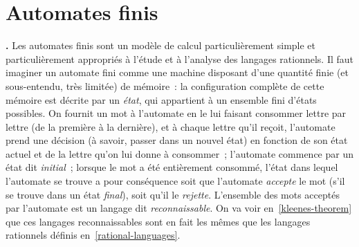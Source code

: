 \documentclass[12pt,a4paper]{article}
\theoremstyle{definition}
\newcommand\thingy{%
\refstepcounter{comcnt}\medskip\noindent\textbf{\thecomcnt.} }
\begin{document}
\section{Automates finis}\label{section-finite-automata}

\setcounter{comcnt}{0}

\thingy Les automates finis sont un modèle de calcul particulièrement
simple et particulièrement appropriés à l'étude et à l'analyse des
langages rationnels.  Il faut imaginer un automate fini comme une
machine disposant d'une quantité finie (et sous-entendu, très limitée)
de mémoire : la configuration complète de cette mémoire est décrite
par un \emph{état}, qui appartient à un ensemble fini d'états
possibles.  On fournit un mot à l'automate en le lui faisant consommer
lettre par lettre (de la première à la dernière), et à chaque lettre
qu'il reçoit, l'automate prend une décision (à savoir, passer dans un
nouvel état) en fonction de son état actuel et de la lettre qu'on lui
donne à consommer ; l'automate commence par un état dit
\emph{initial} ; lorsque le mot a été entièrement consommé, l'état
dans lequel l'automate se trouve a pour conséquence soit que
l'automate \emph{accepte} le mot (s'il se trouve dans un état
\emph{final}), soit qu'il le \emph{rejette}.  L'ensemble des mots
acceptés par l'automate est un langage dit \emph{reconnaissable}.  On
va voir en \ref{kleenes-theorem} que ces langages reconnaissables sont
en fait les mêmes que les langages rationnels définis
en \ref{rational-languages}.
\end{document}
